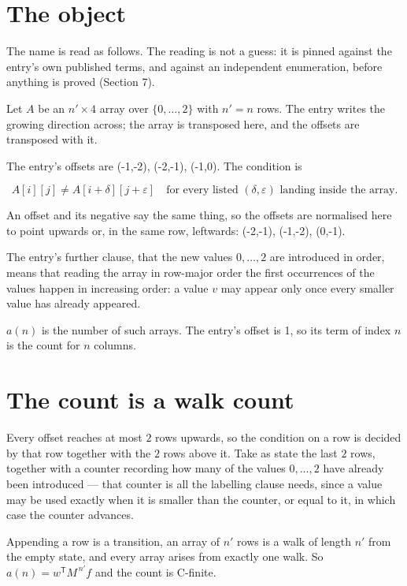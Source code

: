 \documentclass[11pt]{article}
\theoremstyle{definition}
\begin{document}
\section{The object}

The name is read as follows. The reading is not a guess: it is pinned against the entry's own published terms, and against an independent enumeration, before anything is proved (Section 7).

Let $A$ be an $n' \times 4$ array over $\{0,\dots,2\}$ with $n' = n$ rows. The entry writes the growing direction across; the array is transposed here, and the offsets are transposed with it.

The entry's offsets are (-1,-2), (-2,-1), (-1,0). The condition is

\[A[i][j] \ne A[i{+}\delta][j{+}\varepsilon]\quad\text{for every listed }(\delta,\varepsilon)\text{ landing inside the array.}\]

An offset and its negative say the same thing, so the offsets are normalised here to point upwards or, in the same row, leftwards: (-2,-1), (-1,-2), (0,-1).

The entry's further clause, that the new values $0,\dots,2$ are introduced in order, means that reading the array in row-major order the first occurrences of the values happen in increasing order: a value $v$ may appear only once every smaller value has already appeared.

$a(n)$ is the number of such arrays. The entry's offset is 1, so its term of index $n$ is the count for $n$ columns.

\section{The count is a walk count}

Every offset reaches at most $2$ rows upwards, so the condition on a row is decided by that row together with the $2$ rows above it. Take as state the last $2$ rows, together with a counter recording how many of the values $0,\dots,2$ have already been introduced --- that counter is all the labelling clause needs, since a value may be used exactly when it is smaller than the counter, or equal to it, in which case the counter advances.

Appending a row is a transition, an array of $n'$ rows is a walk of length $n'$ from the empty state, and every array arises from exactly one walk. So $a(n) = w^{\mathsf T}M^{\,n'}f$ and the count is C-finite.
\end{document}
